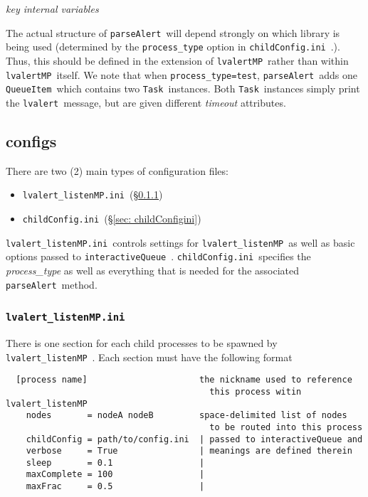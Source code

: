 \documentclass{article}
\newcommand{\alert}{\texttt{lvalert}~}
\newcommand{\lvalertMP}{\texttt{lvalertMP}~}
\newcommand{\lvalertListenMP}{\texttt{lvalert\_listenMP}~}
\newcommand{\interactiveQueue}{\texttt{interactiveQueue}~}
\newcommand{\parseAlert}{\texttt{parseAlert}~}
\newcommand{\QueueItem}{\texttt{QueueItem}~}
\newcommand{\Task}{\texttt{Task}~}
\newcommand{\lvalertMPini}{\texttt{lvalert\_listenMP.ini}~}
\newcommand{\childConfigini}{\texttt{childConfig.ini}~}
\begin{document}
\noindent
\textit{key internal variables}

The actual structure of \parseAlert will depend strongly on which library is being used (determined by the \texttt{process\_type} option in \childConfigini.). 
Thus, this should be defined in the extension of \lvalertMP rather than within \lvalertMP itself.
We note that when \texttt{process\_type=test}, \parseAlert adds one \QueueItem which contains two \Task instances. 
Both \Task instances simply print the \alert message, but are given different \textit{timeout} attributes.


\subsection{configs}
\label{sec: configs}

There are two (2) main types of configuration files:
\begin{itemize}
    \item{\lvalertMPini (\S\ref{sec: lvalertMPini})}
    \item{\childConfigini (\S\ref{sec: childConfigini})}
\end{itemize}
\lvalertMPini controls settings for \lvalertListenMP as well as basic options passed to \interactiveQueue.
\childConfigini specifies the \textit{process\_type} as well as everything that is needed for the associated \parseAlert method.


\subsubsection{\lvalertMPini}
\label{sec: lvalertMPini}

There is one section for each child processes to be spawned by \lvalertListenMP.
Each section must have the following format

\begin{verbatim}
  [process name]                      the nickname used to reference 
                                        this process witin lvalert_listenMP
    nodes       = nodeA nodeB         space-delimited list of nodes 
                                        to be routed into this process
    childConfig = path/to/config.ini  | passed to interactiveQueue and 
    verbose     = True                | meanings are defined therein
    sleep       = 0.1                 |
    maxComplete = 100                 |
    maxFrac     = 0.5                 |
\end{verbatim}
\end{document}
